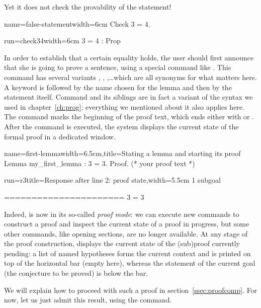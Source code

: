 Yet it does not check the provability of the statement!

\begin{coq-left}{name=false-statement}{width=6cm}
Check 3 = 4.
\end{coq-left}
\begin{coqout-right}{run=check34}{width=6cm}
3 = 4 : Prop
\end{coqout-right}

In order to establish that a certain equality holds, the user should
first announce that she is going to prove a sentence, using a special
command like . This command has several variants ,
, ,\dots which are all synonyms for what
matters here.
A  keyword is followed by the name chosen for the lemma and
then by the statement itself. Command  and its siblings are in fact
a variant of the  syntax we used in
chapter~\ref{ch:prog}: everything we mentioned about it also applies
here. The  command marks the beginning of the proof text,
which ends either with  or . After the command
 is executed, the system displays the current state of the
formal proof in a dedicated window.

\begin{coq-left}{name=first-lemma}{width=6.5cm,title=Stating a lemma and starting its proof}
Lemma my_first_lemma : 3 = 3.
Proof.
(* your proof text *)
$~$
\end{coq-left}
\begin{coqout-right}{run=r3}{title=Response after line 2: proof state,width=5.5cm}
1 subgoal

  ======================
   3 = 3
\end{coqout-right}

Indeed, \Coq{} is now in its so-called \emph{proof mode}: we can execute
new commands to construct a proof and inspect the current state of a
proof in progress, but some other commands, like opening sections, are
no longer available. At any stage of the proof construction, \Coq{}
displays the current state of the (sub)proof currently pending:  a
list of named hypotheses forms the current context and is printed
on top of the horizontal bar (empty here), whereas
the statement of the current goal (the conjecture to be proved) is
below the bar.

We will explain how to proceed with such a proof in
section~\ref{ssec:proofcomp}.
For now, let us just admit this result, using the 
command.

